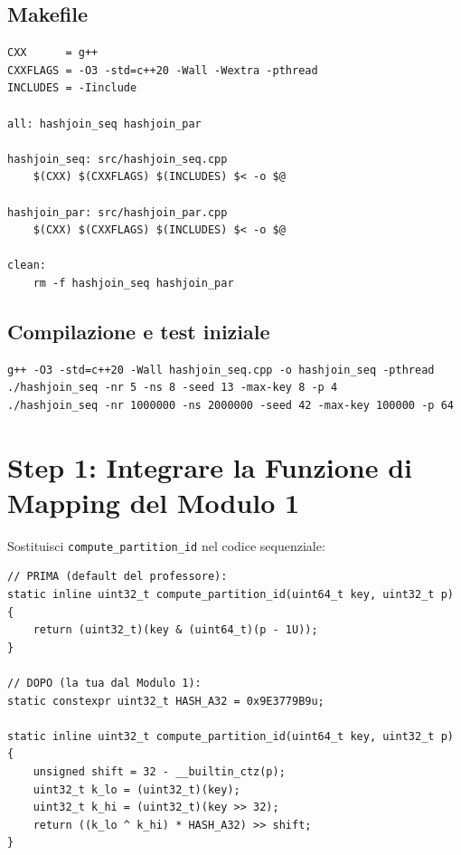 \documentclass[11pt,a4paper]{article}
\begin{document}
\subsection{Makefile}

\begin{lstlisting}[style=make,caption={Makefile}]
CXX      = g++
CXXFLAGS = -O3 -std=c++20 -Wall -Wextra -pthread
INCLUDES = -Iinclude

all: hashjoin_seq hashjoin_par

hashjoin_seq: src/hashjoin_seq.cpp
	$(CXX) $(CXXFLAGS) $(INCLUDES) $< -o $@

hashjoin_par: src/hashjoin_par.cpp
	$(CXX) $(CXXFLAGS) $(INCLUDES) $< -o $@

clean:
	rm -f hashjoin_seq hashjoin_par
\end{lstlisting}

\subsection{Compilazione e test iniziale}

\begin{lstlisting}[style=bash]
g++ -O3 -std=c++20 -Wall hashjoin_seq.cpp -o hashjoin_seq -pthread
./hashjoin_seq -nr 5 -ns 8 -seed 13 -max-key 8 -p 4
./hashjoin_seq -nr 1000000 -ns 2000000 -seed 42 -max-key 100000 -p 64
\end{lstlisting}


\section{Step 1: Integrare la Funzione di Mapping del Modulo 1}

Sostituisci \texttt{compute\_partition\_id} nel codice sequenziale:

\begin{lstlisting}[style=cpp,caption={Sostituzione della hash}]
// PRIMA (default del professore):
static inline uint32_t compute_partition_id(uint64_t key, uint32_t p) {
    return (uint32_t)(key & (uint64_t)(p - 1U));
}

// DOPO (la tua dal Modulo 1):
static constexpr uint32_t HASH_A32 = 0x9E3779B9u;

static inline uint32_t compute_partition_id(uint64_t key, uint32_t p) {
    unsigned shift = 32 - __builtin_ctz(p);
    uint32_t k_lo = (uint32_t)(key);
    uint32_t k_hi = (uint32_t)(key >> 32);
    return ((k_lo ^ k_hi) * HASH_A32) >> shift;
}
\end{lstlisting}
\end{document}
